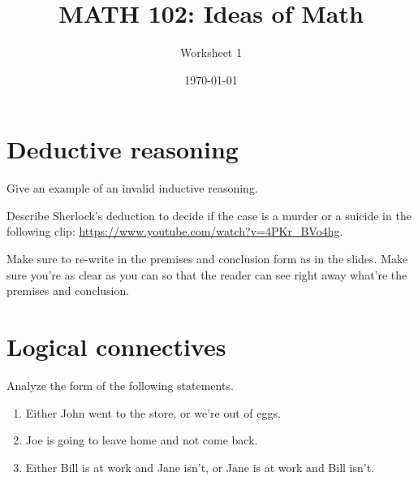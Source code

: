 \documentclass[12pt]{amsart}
\title{ MATH 102: Ideas  of Math }
\author{ Worksheet 1 }
\date{\today}
\begin{document}
\maketitle

\section{ Deductive reasoning }

\begin{problem}
    Give an example of an invalid inductive reasoning.
\end{problem}

\begin{problem}
    Describe Sherlock's deduction to decide if the case is a murder or
    a suicide in the following clip:
    \url{https://www.youtube.com/watch?v=4PKr_BVo4hg}.

    Make sure to re-write in the premises and conclusion form as in the slides. Make sure you're as clear as you can so that the reader can see right away what're the premises and conclusion.
\end{problem}


\section{ Logical connectives}

\begin{problem}
Analyze the form of the following statements.

\begin{enumerate}
    \item Either John went to the store, or we’re out of eggs.
    \item  Joe is going to leave home and not come back.
    \item Either Bill is at work and Jane isn’t, or Jane is at work and Bill isn’t.
\end{enumerate}
\end{problem}


\printbibliography 
%
%
\end{document}
